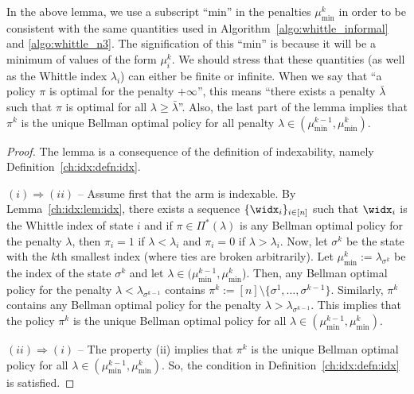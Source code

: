 In the above lemma, we use a subscript ``min'' in the penalties $\mu^{k}_{\min}$ in order to be consistent with the same quantities used in Algorithm~\ref{algo:whittle_informal} and \ref{algo:whittle_n3}.  The signification of this ``min'' is because it will be a minimum of values of the form $\mu^k_i$.  We should stress that these quantities (as well as the Whittle index $\lambda_i$) can either be finite or infinite. When we say that ``a policy $\pi$ is optimal for the penalty $+\infty$'', this means ``there exists a penalty $\bar{\lambda}$ such that $\pi$ is optimal for all $\lambda\ge\bar{\lambda}$''.  Also, the last part of the lemma implies that $\pi^k$ is the unique Bellman optimal policy for all penalty $\lambda\in(\mu^{k-1}_{\min}, \mu^{k}_{\min})$.

\begin{proof}
    The lemma is a consequence of the definition of indexability, namely Definition~\ref{ch:idx:defn:idx}.

    $(i)\Rightarrow(ii)$ -- Assume first that the arm is indexable.
    By Lemma~\ref{ch:idx:lem:idx}, there exists a sequence $\{\widx_i\}_{i\in[n]}$ such that $\widx_i$ is the Whittle index of state $i$ and if $\pi\in\Pi^*(\lambda)$ is any Bellman optimal policy for the penalty $\lambda$, then $\pi_i=1$ if $\lambda<\lambda_i$ and $\pi_i=0$ if $\lambda>\lambda_i$.
    Now, let $\sigma^k$ be the state with the $k$th smallest index (where ties are broken arbitrarily).
    Let $\mu^k_{\min}:=\lambda_{\sigma^k}$ be the index of the state $\sigma^k$ and let $\lambda\in(\mu^{k-1}_{\min},\mu^{k}_{\min}$).
    Then, any Bellman optimal policy for the penalty $\lambda<\lambda_{\sigma^{k-1}}$ contains $\pi^{k}:=[n]\setminus\{\sigma^1,\dots, \sigma^{k-1}\}$.
    Similarly, $\pi^{k}$ contains any Bellman optimal policy for the penalty $\lambda>\lambda_{\sigma^{k-1}}$.
    This implies that the policy $\pi^{k}$ is the unique Bellman optimal policy for all $\lambda\in(\mu^{k-1}_{\min},\mu^{k}_{\min})$. 

    $(ii)\Rightarrow(i)$ -- The property (ii) implies that $\pi^k$ is the unique Bellman optimal policy for all $\lambda\in(\mu^{k-1}_{\min},\mu^k_{\min})$. 
    So, the condition in Definition~\ref{ch:idx:defn:idx} is satisfied.
\end{proof}





